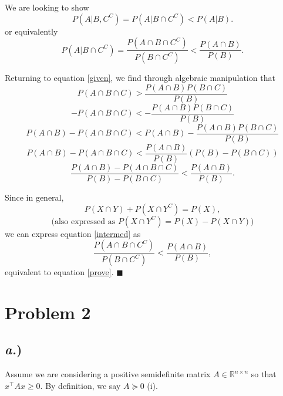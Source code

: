 \documentclass{report}
\begin{document}
We are looking to show $$P(A|B,C^{C}) = P(A|B \cap C^{C}) < P(A|B).$$
or equivalently \begin{equation}P(A|B \cap C^{C}) =\frac{P(A \cap B \cap C^{C})}{P(B \cap C^{C})} < \frac{P(A \cap B)}{P(B)}.\label{prove}\end{equation}

Returning to equation \ref{given}, we find through algebraic manipulation that
$$P(A \cap B \cap C) > \frac{P(A \cap B) P(B \cap C)}{P(B)}$$
$$-P(A \cap B \cap C) < -\frac{P(A \cap B) P(B \cap C)}{P(B)}$$
$$P(A \cap B) - P(A \cap B \cap C) < P(A \cap B) - \frac{P(A \cap B) P(B \cap C)}{P(B)}$$
$$P(A \cap B) - P(A \cap B \cap C) < \frac{P(A \cap B)}{P(B)}\left(P(B) - P(B \cap C)\right)$$
\begin{equation}\frac{P(A \cap B) - P(A \cap B \cap C)}{P(B) - P(B \cap C)} < \frac{P(A \cap B)}{P(B)}.\label{intermed}\end{equation}

Since in general, $$P(X \cap Y) + P(X \cap Y^{C}) = P(X),$$
$$\text{(also expressed as }P(X \cap Y^{C}) = P(X) - P(X \cap Y))$$
we can express equation \ref{intermed} as $$\frac{P(A \cap B \cap C^{C})}{P(B \cap C^{C})} < \frac{P(A \cap B)}{P(B)},$$
equivalent to equation \ref{prove}. $\blacksquare$



\newpage
\section*{Problem 2}

\subsection*{\textit{a.})}

Assume we are considering a positive semidefinite matrix $A \in \mathbb{R}^{n \times n}$ so that $x^{\top}Ax \geq 0$. By definition, we say $A \succeq 0$ (i).
\end{document}
